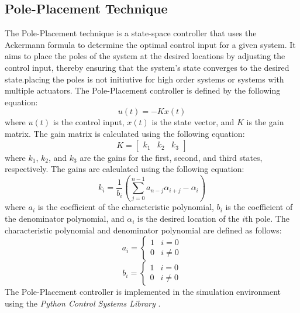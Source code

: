 \subsection{Pole-Placement Technique}
The Pole-Placement technique is a state-space controller that uses the Ackermann formula to determine the optimal control input for a given system. It aims to place the poles of the system at the desired locations by adjusting the control input, thereby ensuring that the system's state converges to the desired state.placing the poles is not initiutive for high order systems or systems with multiple actuators. The Pole-Placement controller is defined by the following equation:
\begin{equation}
	u(t) = -Kx(t)
\end{equation}
where $u(t)$ is the control input, $x(t)$ is the state vector, and $K$ is the gain matrix. The gain matrix is calculated using the following equation:
\begin{equation}
	K = \begin{bmatrix}
		k_1 & k_2 & k_3
	\end{bmatrix}
\end{equation}
where $k_1$, $k_2$, and $k_3$ are the gains for the first, second, and third states, respectively. The gains are calculated using the following equation:
\begin{equation}
	k_i = \frac{1}{b_i} \left( \sum_{j=0}^{n-1} a_{n-j} \alpha_{i+j} - \alpha_i \right)
\end{equation}
where $a_i$ is the coefficient of the characteristic polynomial, $b_i$ is the coefficient of the denominator polynomial, and $\alpha_i$ is the desired location of the $i$th pole. The characteristic polynomial and denominator polynomial are defined as follows:
\begin{equation}
	a_i = \begin{cases}
		1 & i = 0 \\
		0 & i \neq 0
	\end{cases}
\end{equation}
\begin{equation}
	b_i = \begin{cases}
		1 & i = 0 \\
		0 & i \neq 0
	\end{cases}
\end{equation}
The Pole-Placement controller is implemented in the simulation environment using the \textit{Python Control Systems Library} \cite{python_control2021}.
